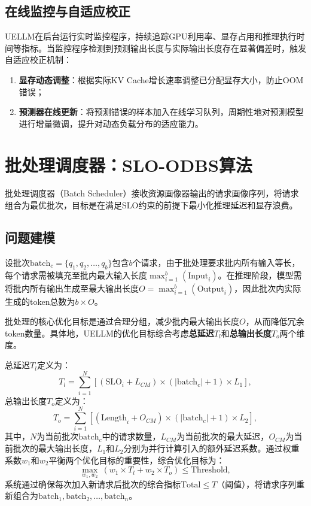 \subsection{在线监控与自适应校正}

UELLM在后台运行实时监控程序，持续追踪GPU利用率、显存占用和推理执行时间等指标。当监控程序检测到预测输出长度与实际输出长度存在显著偏差时，触发自适应校正机制：
\begin{enumerate}
    \item \textbf{显存动态调整}：根据实际KV Cache增长速率调整已分配显存大小，防止OOM错误；
    \item \textbf{预测器在线更新}：将预测错误的样本加入在线学习队列，周期性地对预测模型进行增量微调，提升对动态负载分布的适应能力。
\end{enumerate}

\section{批处理调度器：SLO-ODBS算法}
\label{sec:uellm_scheduler}

批处理调度器（Batch Scheduler）接收资源画像器输出的请求画像序列，将请求组合为最优批次，目标是在满足SLO约束的前提下最小化推理延迟和显存浪费。

\subsection{问题建模}

设批次$\text{batch}_c=\{q_1, q_2, \ldots, q_b\}$包含$b$个请求，由于批处理要求批内所有输入等长，每个请求需被填充至批内最大输入长度$\max_{i=1}^{b}(\text{Input}_i)$。在推理阶段，模型需将批内所有输出生成至最大输出长度$O = \max_{i=1}^{b}(\text{Output}_i)$，因此批次内实际生成的token总数为$b \times O$。

批处理的核心优化目标是通过合理分组，减少批内最大输出长度$O$，从而降低冗余token数量。具体地，UELLM的优化目标综合考虑\textbf{总延迟}$T_l$和\textbf{总输出长度}$T_o$两个维度。

总延迟$T_l$定义为：
\begin{equation}
    T_l = \sum_{i=1}^{N} \left[ (\text{SLO}_i + L_{CM}) \times (|\text{batch}_c| + 1) \times L_1 \right],
    \label{eq:total_latency}
\end{equation}
总输出长度$T_o$定义为：
\begin{equation}
    T_o = \sum_{i=1}^{N} \left[ (\text{Length}_i + O_{CM}) \times (|\text{batch}_c| + 1) \times L_2 \right],
    \label{eq:total_output}
\end{equation}
其中，$N$为当前批次$\text{batch}_c$中的请求数量，$L_{CM}$为当前批次的最大延迟，$O_{CM}$为当前批次的最大输出长度，$L_1$和$L_2$分别为并行计算引入的额外延迟系数。通过权重系数$w_1$和$w_2$平衡两个优化目标的重要性，综合优化目标为：
\begin{equation}
    \max_{w_1, w_2}\ (w_1 \times T_l + w_2 \times T_o) \leq \text{Threshold},
    \label{eq:optimization_objective}
\end{equation}
系统通过确保每次加入新请求后批次的综合指标$\text{Total} \leq T$（阈值），将请求序列重新组合为$\text{batch}_1, \text{batch}_2, \ldots, \text{batch}_n$。

